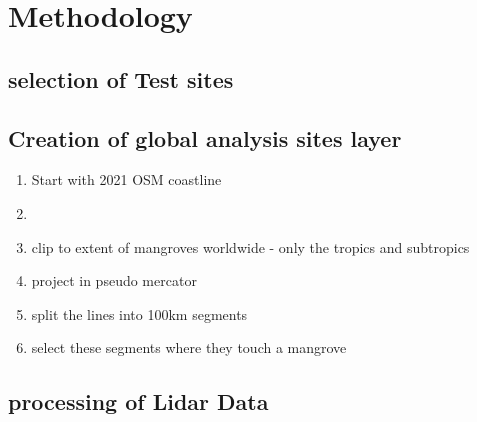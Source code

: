 \chapter{Methodology}
\section{selection of Test sites}
\section{Creation of global analysis sites layer}
\begin{enumerate}
    \item Start with 2021 OSM coastline
    \item 
    \item clip to extent of mangroves worldwide - only the tropics and subtropics
    \item project in pseudo mercator
    \item split the lines into 100km segments
    \item select these segments where they touch a mangrove 
\end{enumerate}

\section{processing of Lidar Data}